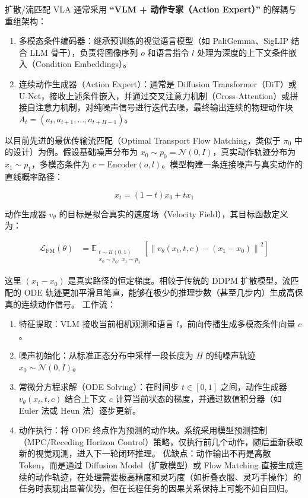 扩散/流匹配 VLA 通常采用 \textbf{``VLM + 动作专家（Action Expert）''} 的解耦与重组架构：

\begin{enumerate}
\def\labelenumi{\arabic{enumi}.}
\item
  多模态条件编码器：继承预训练的视觉语言模型（如 PaliGemma、SigLIP 结合 LLM 骨干），负责将图像序列 \(o\) 和语言指令 \(l\) 处理为深度的上下文条件嵌入（Condition Embeddings）。
\item
  连续动作生成器（Action Expert）：通常是 Diffusion Transformer（DiT）或 U-Net，接收上述条件嵌入，并通过交叉注意力机制（Cross-Attention）或拼接自注意力机制，对纯噪声信号进行迭代去噪，最终输出连续的物理动作块 \(A_t=(a_t,a_{t+1},\ldots,a_{t+H-1})\)。
\end{enumerate}

以目前先进的最优传输流匹配（Optimal Transport Flow Matching，类似于 \(\pi_0\) 中的设计）为例。假设基础噪声分布为 \(x_0\sim p_0=\mathcal{N}(0,I)\)，真实动作轨迹分布为 \(x_1\sim p_1\)，多模态条件为 \(c=\mathrm{Encoder}(o,l)\)。模型构建一条连接噪声与真实动作的直线概率路径：

\[
x_t=(1-t)x_0+t x_1
\]

动作生成器 \(v_\theta\) 的目标是拟合真实的速度场（Velocity Field），其目标函数定义为：

\[
\begin{aligned}
\mathcal{L}_{\mathrm{FM}}(\theta)
&=
\mathbb{E}_{\substack{t\sim \mathcal{U}(0,1)\\ x_0\sim p_0,\ x_1\sim p_1}}
\left[
\left\|v_\theta(x_t,t,c)-(x_1-x_0)\right\|^2
\right]
\end{aligned}
\]

这里 \((x_1-x_0)\) 是真实路径的恒定梯度。相较于传统的 DDPM 扩散模型，流匹配的 ODE 轨迹更加平滑且笔直，能够在极少的推理步数（甚至几步内）生成高保真的连续动作信号。
工作流：

\begin{enumerate}
\def\labelenumi{\arabic{enumi}.}
\item
  特征提取：VLM 接收当前相机观测和语言 \(l\)，前向传播生成多模态条件向量 \(c\)。
\item
  噪声初始化：从标准正态分布中采样一段长度为 \(H\) 的纯噪声轨迹 \(x_0\sim\mathcal{N}(0,I)\)。
\item
  常微分方程求解（ODE Solving）：在时间步 \(t\in[0,1]\) 之间，动作生成器 \(v_\theta(x_t,t,c)\) 结合上下文 \(c\) 计算当前状态的梯度，并通过数值积分器（如 Euler 法或 Heun 法）逐步更新。
\item
  动作执行：将 ODE 终点作为预测的动作块。系统采用模型预测控制（MPC/Receding Horizon Control）策略，仅执行前几个动作，随后重新获取新的视觉观测，进入下一轮闭环推理。
  优缺点：动作输出不再是离散 Token，而是通过 Diffusion Model（扩散模型）或 Flow Matching 直接生成连续的动作轨迹，在处理需要极高精度和灵巧度（如折叠衣服、灵巧手操作）的任务时表现出显著优势，但在长程任务的因果关系保持上可能不如自回归。
\end{enumerate}

